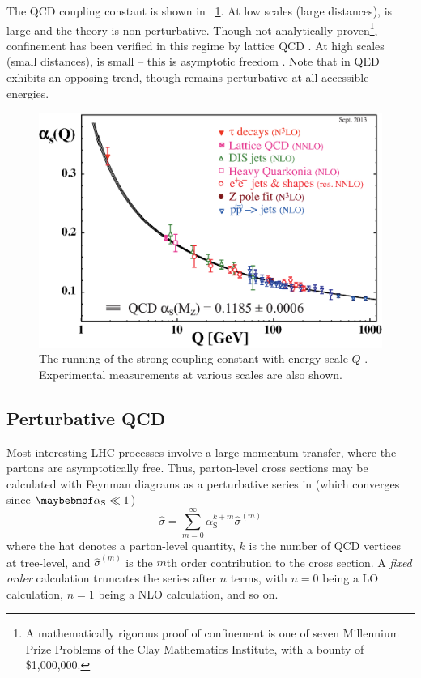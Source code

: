 The \ac{QCD} coupling constant \alphaS is shown in \Figure~\ref{fig:alpha_s}. At low 
scales (large distances), \alphaS is large and the theory is non-perturbative. 
Though not analytically proven\footnote{
	A mathematically rigorous proof of confinement is one of seven Millennium Prize 
	Problems of the Clay Mathematics Institute, with a bounty of \$1,000,000.
}, confinement has been verified in this regime by lattice \ac{QCD} \cite{Wilson:1974}. 
At high scales (small distances), \alphaS is small -- this is asymptotic freedom 
\cite{Gross:1973,Politzer:1973}. Note that \alphaEM in \acs{QED} exhibits an opposing 
trend, though remains perturbative at all accessible energies.
\begin{figure}
	\includegraphics[width=\mediumfigwidth]{tex/tools/alpha_s}
	\caption{The running of the strong coupling constant \alphaS with energy scale $Q$ 
	\cite{PDG:2012}. Experimental measurements at various scales are also shown.}
	\label{fig:alpha_s}
\end{figure}



\subsection{Perturbative QCD}
\label{sec:qcd:pqcd}

Most interesting \acs{LHC} processes involve a large momentum transfer, where the partons 
are asymptotically free. Thus, parton-level cross sections may be calculated with Feynman 
diagrams as a perturbative series in \alphaS (which converges since $\alphaS \ll 1$)
\begin{equation}
	\hat{\sigma} = \sum\limits_{m=0}^{\infty} \alpha_{\text{S}}^{k+m} \hat{\sigma}^{(m)}
	\label{eq:qcd:partonic_xs}
\end{equation}
where the hat denotes a parton-level quantity, $k$ is the number of \ac{QCD} vertices at 
tree-level, and $\hat{\sigma}^{(m)}$ is the $m$th order contribution to the cross section.
A \textit{fixed order} calculation truncates the series after $n$ terms, with $n=0$ being 
a \ac{LO} calculation, $n=1$ being a \ac{NLO} calculation, and so on.

